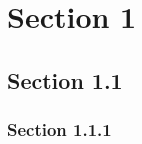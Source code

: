 \documentclass{article}
\begin{document}
\section{Section 1}
\subsection{Section 1.1}
\subsubsection{Section 1.1.1}
\end{document}
